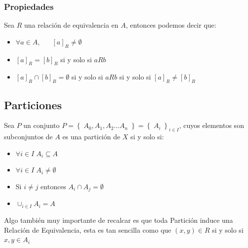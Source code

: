 \documentclass[12pt, fleqn]{report}                             %
\DeclareMathOperator \Space     {\quad}                         %
\theoremstyle{break}                                            %
\newcommand{\Set}[1]            {\left\{ \; #1 \; \right\}}     %
\begin{document}
                    \subsubsection{Propiedades}

                    Sea $R$ una relación de equivalencia en $A$, entonces podemos decir que:
                    \begin{itemize}

                        \item $\forall a \in A, \Space [a]_R \neq \emptyset$

                        \item $[a]_R = [b]_R$ si y solo si $a R b$

                        \item $[a]_R \cap [b]_R = \emptyset$ si y solo si $a R b$ si y solo si
                            $[a]_R \neq [b]_R$

                    \end{itemize}


            \clearpage
            \subsection{Particiones}

                Sea $P$ un conjunto $P = \Set{A_0, A_1, A_2 \dots A_n} = \Set{A_i}_{i \in I}$, 
                cuyos elementos son subconjuntos de $A$ es una partición de $X$ si y solo si:

                \begin{itemize}
                    \item $\forall i \in I \; A_i \subseteq A$

                    \item $\forall i \in I \; A_i \neq \emptyset$

                    \item Si $i \neq j$ entonces $A_i \cap A_j = \emptyset$

                    \item $\cup_{i \in I} A_i = A$
                \end{itemize}


                Algo también muy importante de recalcar es que toda Partición induce una Relación de
                Equivalencia, esta es tan sencilla como que $(x,y) \in R$ si y solo si $x, y \in A_i$
\end{document}
